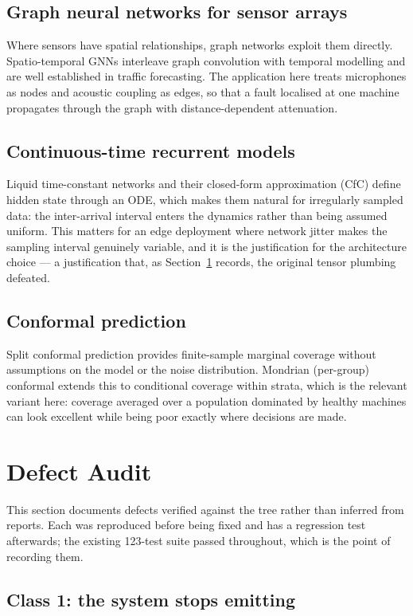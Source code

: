 \documentclass[11pt]{article}
\let\oldsection\section
\renewcommand{\section}{\clearpage\oldsection}
\begin{document}
\subsection{Graph neural networks for sensor arrays}
Where sensors have spatial relationships, graph networks exploit them directly.
Spatio-temporal GNNs interleave graph convolution with temporal modelling and
are well established in traffic forecasting. The application here treats
microphones as nodes and acoustic coupling as edges, so that a fault localised
at one machine propagates through the graph with distance-dependent
attenuation.

\subsection{Continuous-time recurrent models}
Liquid time-constant networks and their closed-form approximation (CfC) define
hidden state through an ODE, which makes them natural for irregularly sampled
data: the inter-arrival interval enters the dynamics rather than being assumed
uniform. This matters for an edge deployment where network jitter makes the
sampling interval genuinely variable, and it is the justification for the
architecture choice --- a justification that, as Section~\ref{sec:audit} records,
the original tensor plumbing defeated.

\subsection{Conformal prediction}
Split conformal prediction provides finite-sample marginal coverage without
assumptions on the model or the noise distribution. Mondrian (per-group)
conformal extends this to conditional coverage within strata, which is the
relevant variant here: coverage averaged over a population dominated by healthy
machines can look excellent while being poor exactly where decisions are made.

\section{Defect Audit}
\label{sec:audit}

This section documents defects verified against the tree rather than inferred
from reports. Each was reproduced before being fixed and has a regression test
afterwards; the existing 123-test suite passed throughout, which is the point of
recording them.

\subsection{Class 1: the system stops emitting}
\end{document}
